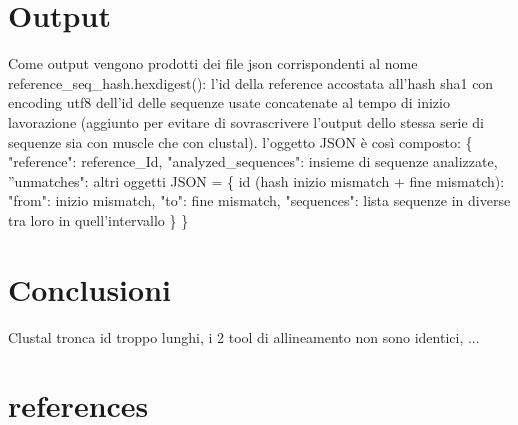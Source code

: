 \documentclass[12pt]{article}
\begin{document}
\section{Output}	
	Come output vengono prodotti dei file json corrispondenti al nome reference\_seq\_hash.hexdigest(): l'id della reference accostata all'hash sha1 con encoding utf8 dell'id delle sequenze usate concatenate al tempo di inizio lavorazione (aggiunto per evitare di sovrascrivere l'output dello stessa serie di sequenze sia con muscle che con clustal).\newline
	l'oggetto JSON è così composto: \{ "reference": reference\_Id, \newline "analyzed\_sequences": insieme di sequenze analizzate, \newline
 	''unmatches": altri oggetti JSON = \newline\{ id (hash inizio mismatch + fine mismatch): "from": inizio mismatch, \newline
   "to": fine mismatch, \newline
   "sequences": lista sequenze in diverse tra loro in quell'intervallo \} \newline
 \}
 
\section{Conclusioni}
	Clustal tronca id troppo lunghi, i 2 tool di allineamento non sono identici, ...
\section{references}
\end{document}
